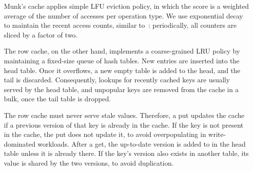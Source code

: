 Munk's cache applies simple LFU eviction policy,
in which the score is a weighted average of the number of accesses per operation type. We 
use exponential decay to maintain the recent access counts, similar to~\cite{tinyLFU}: periodically, all counters are 
sliced by a factor of two. 



The row cache, on the other hand, implements a coarse-grained LRU policy by maintaining a fixed-size queue of hash tables. 
New entries are inserted into the head table. Once it overflows, a new empty table is added to the head,
and the tail is discarded. Consequently, lookups for recently cached keys are usually served by the head 
table, and unpopular keys are removed from the cache in a bulk, once the tail table is dropped.

The row cache must never serve stale values. %
Therefore, a put updates the cache  if a previous version of that key is already in the cache. 
If the key is not present in the cache, the put does not update it, to avoid overpopulating  in write-dominated workloads. 
After a get, the up-to-date version is added to in the head table unless it is already there.
If the key's version also exists in another table, its value is shared by the two versions, to avoid duplication.

